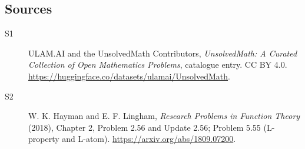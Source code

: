 \documentclass[11pt]{article}
\begin{document}
\subsection{Sources}
\begin{description}
\item[\hypertarget{source:statement:1}{S1}] ULAM.AI and the UnsolvedMath Contributors, \emph{UnsolvedMath: A Curated Collection of Open Mathematics Problems}, catalogue entry. CC BY 4.0. \url{https://huggingface.co/datasets/ulamai/UnsolvedMath}.
\item[\hypertarget{source:statement:2}{S2}] W. K. Hayman and E. F. Lingham, \emph{Research Problems in Function Theory} (2018), Chapter 2, Problem 2.56 and Update 2.56; Problem 5.55 (L-property and L-atom). \url{https://arxiv.org/abs/1809.07200}.
\end{description}
\label{end:statement}
\end{document}
